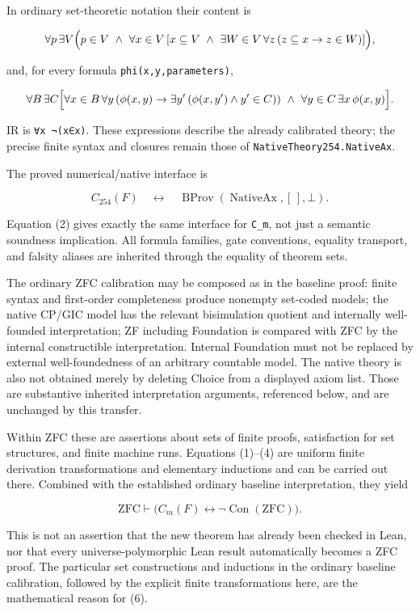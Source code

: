 In ordinary set-theoretic notation their content is

\[
\forall p\,\exists V\Bigl(p\in V\ \land\
 \forall x\in V\,[x\subseteq V\ \land\ \exists W\in V\,\forall z\,(z\subseteq x\to z\in W)]\Bigr),
\]

and, for every formula \texttt{phi(x,y,parameters)},

\[
\forall B\,\exists C\Bigl[
 \forall x\in B\,\forall y\,(\phi(x,y)\to\exists y'\,(\phi(x,y')\land y'\in C))
 \ \land\ \forall y\in C\,\exists x\,\phi(x,y)\Bigr].
\]

IR is \texttt{∀x\ ¬(x∈x)}. These expressions describe the already
calibrated theory; the precise finite syntax and closures remain those
of \texttt{NativeTheory254.NativeAx}.

The proved numerical/native interface is

\[
C_{254}(F)\quad\longleftrightarrow\quad
\operatorname{BProv}(\operatorname{NativeAx},[\,],\bot).
\tag{5}
\]

Equation (2) gives exactly the same interface for \texttt{C\_m}, not
just a semantic soundness implication. All formula families, gate
conventions, equality transport, and falsity aliases are inherited
through the equality of theorem sets.

The ordinary ZFC calibration may be composed as in the baseline proof:
finite syntax and first-order completeness produce nonempty set-coded
models; the native CP/GIC model has the relevant bisimulation quotient
and internally well-founded interpretation; ZF including Foundation is
compared with ZFC by the internal constructible interpretation. Internal
Foundation must not be replaced by external well-foundedness of an
arbitrary countable model. The native theory is also not obtained merely
by deleting Choice from a displayed axiom list. Those are substantive
inherited interpretation arguments, referenced below, and are unchanged
by this transfer.

Within ZFC these are assertions about sets of finite proofs,
satisfaction for set structures, and finite machine runs. Equations
(1)--(4) are uniform finite derivation transformations and elementary
inductions and can be carried out there. Combined with the established
ordinary baseline interpretation, they yield

\[
\mathrm{ZFC}\vdash
\bigl(C_m(F)\leftrightarrow\neg\operatorname{Con}(\mathrm{ZFC})\bigr).
\tag{6}
\]

This is not an assertion that the new theorem has already been checked
in Lean, nor that every universe-polymorphic Lean result automatically
becomes a ZFC proof. The particular set constructions and inductions in
the ordinary baseline calibration, followed by the explicit finite
transformations here, are the mathematical reason for (6).

